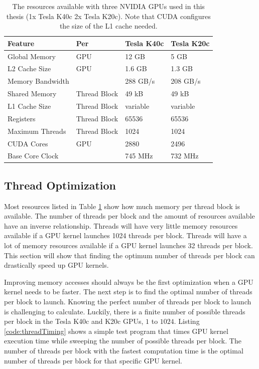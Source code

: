 \begin{table}
\caption{The resources available with three NVIDIA GPUs used in this thesis (1x Tesla K40c 2x Tesla K20c). Note that CUDA configures the size of the L1 cache needed.}
\begin{center}
\begin{tabular}{llll}
	\toprule
	Feature 			& Per			& Tesla K40c 	& Tesla K20c	\\ \midrule
	Global Memory 		& GPU			& 12 GB	 		& 5 GB			\\
	L2 Cache Size 		& GPU			& 1.6 GB		& 1.3 GB		\\
	Memory Bandwidth	& 				& 288 GB/s		& 208 GB/s		\\		
	Shared Memory 		& Thread Block	& 49 kB			& 49 kB			\\
	L1 Cache Size 		& Thread Block	& variable		& variable		\\
	Registers			& Thread Block	& 65536			& 65536			\\
	Maximum Threads		& Thread Block	& 1024			& 1024			\\
	CUDA Cores 			& GPU			& 2880 			& 2496 			\\
	Base Core Clock 	&				& 745 MHz 		& 732 MHz		\\ \bottomrule
\end{tabular}
\end{center}
\label{tab:gpu-resources_jeffs}
\end{table}

\subsection{Thread Optimization}
Most resources listed in Table \ref{tab:gpu-resources_jeffs} show how much memory per thread block is available. 
The number of threads per block and the amount of resources available have an inverse relationship.
Threads will have very little memory resources available if a GPU kernel launches 1024 threads per block.
Threads will have a lot of memory resources available if a GPU kernel launches 32 threads per block.
This section will show that finding the optimum number of threads per block can drastically speed up GPU kernels.

Improving memory accesses should always be the first optimization when a GPU kernel needs to be faster.
The next step is to find the optimal number of threads per block to launch.
Knowing the perfect number of threads per block to launch is challenging to calculate.
Luckily, there is a finite number of possible threads per block in the Tesla K40c and K20c GPUs, $1$ to $1024$.
Listing \ref{code:threadTiming} shows a simple test program that times GPU kernel execution time while sweeping the number of possible threads per block.
The number of threads per block with the fastest computation time is the optimal number of threads per block for that specific GPU kernel.

